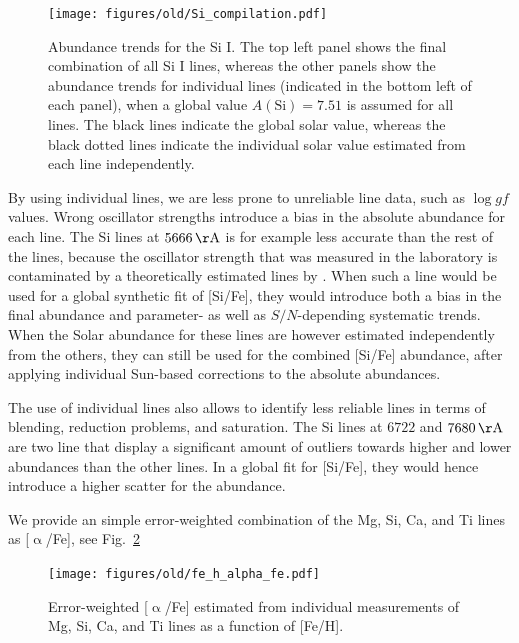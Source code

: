 \documentclass[fleqn,usenatbib,useAMS]{mnras}
\begin{document}
\begin{figure}
\centering
\texttt{[image: figures/old/Si\_compilation.pdf]}
\caption[{Abundance trends for the Si I.}]{Abundance trends for the Si I. The top left panel shows the final combination of all Si I lines, whereas the other panels show the abundance trends for individual lines (indicated in the bottom left of each panel), when a global value $A(\mathrm{Si}) = 7.51$ is assumed for all lines. The black lines indicate the global solar value, whereas the black dotted lines indicate the individual solar value estimated from each line independently.}
\label{fig:Si_abundance_zeropoint_differences}
\end{figure}

By using individual lines, we are less prone to unreliable line data, such as $\log gf$ values. Wrong oscillator strengths introduce a bias in the absolute abundance for each line. The Si lines at $5666\,\mathrm{\AA}$ is for example less accurate than the rest of the lines, because the oscillator strength that was measured in the laboratory \citep{GARZ,BL} is contaminated by a theoretically estimated lines by \citet{K07}. When such a line would be used for a global synthetic fit of [Si/Fe], they would introduce both a bias in the final abundance and parameter- as well as $S/N$-depending systematic trends. When the Solar abundance for these lines are however estimated independently from the others, they can still be used for the combined [Si/Fe] abundance, after applying individual Sun-based corrections to the absolute abundances.

The use of individual lines also allows to identify less reliable lines in terms of blending, reduction problems, and saturation. The Si lines at $6722$ and $7680\,\mathrm{\AA}$ are two line that display a significant amount of outliers towards higher and lower abundances than the other lines. In a global fit for [Si/Fe], they would hence introduce a higher scatter for the abundance.

We provide an simple error-weighted combination of the Mg, Si, Ca, and Ti lines as [$\upalpha$/Fe], see Fig.~\ref{fig:fe_h_alpha_fe}

\begin{figure}
\centering
\texttt{[image: figures/old/fe\_h\_alpha\_fe.pdf]}
\caption[{[$\upalpha$/Fe] as a function of [Fe/H].}]{Error-weighted [$\upalpha$/Fe] estimated from individual measurements of Mg, Si, Ca, and Ti lines as a function of [Fe/H].}
\label{fig:fe_h_alpha_fe}
\end{figure}
\end{document}
